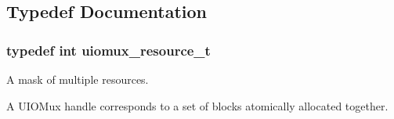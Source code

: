 \subsection{Typedef Documentation}
\subsubsection[{uiomux\_\-resource\_\-t}]{\setlength{\rightskip}{0pt plus 5cm}typedef int {\bf uiomux\_\-resource\_\-t}}\label{resource_8h_aa2e9141f7f5fef8c8a6f781dafcf1ea2}


A mask of multiple resources. 

A UIOMux handle corresponds to a set of blocks atomically allocated together. 